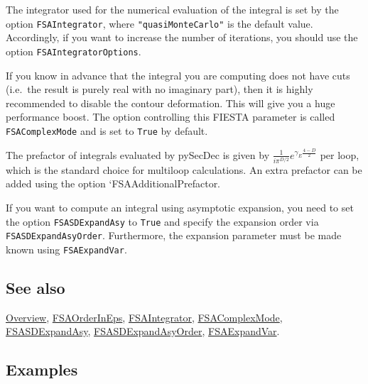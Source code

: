 \documentclass[../FeynHelpersManual.tex]{subfiles}
\begin{document}
The integrator used for the numerical evaluation of the integral is set
by the option \texttt{FSAIntegrator}, where \texttt{"quasiMonteCarlo"}
is the default value. Accordingly, if you want to increase the number of
iterations, you should use the option \texttt{FSAIntegratorOptions}.

If you know in advance that the integral you are computing does not have
cuts (i.e.~the result is purely real with no imaginary part), then it is
highly recommended to disable the contour deformation. This will give
you a huge performance boost. The option controlling this FIESTA
parameter is called \texttt{FSAComplexMode} and is set to \texttt{True}
by default.

The prefactor of integrals evaluated by pySecDec is given by
\(\frac{1}{i \pi^{D/2}} e^{\gamma_E \frac{4-D}{2}}\) per loop, which is
the standard choice for multiloop calculations. An extra prefactor can
be added using the option `FSAAdditionalPrefactor.

If you want to compute an integral using asymptotic expansion, you need
to set the option \texttt{FSASDExpandAsy} to \texttt{True} and specify
the expansion order via \texttt{FSASDExpandAsyOrder}. Furthermore, the
expansion parameter must be made known using \texttt{FSAExpandVar}.

\subsection{See also}

\hyperlink{toc}{Overview}, \hyperlink{fsaorderineps}{FSAOrderInEps},
\hyperlink{fsaintegrator}{FSAIntegrator},
\hyperlink{fsacomplexmode}{FSAComplexMode},
\hyperlink{fsasdexpandasy}{FSASDExpandAsy},
\hyperlink{fsasdexpandasyorder}{FSASDExpandAsyOrder},
\hyperlink{fsaexpandvar}{FSAExpandVar}.

\subsection{Examples}
\end{document}
